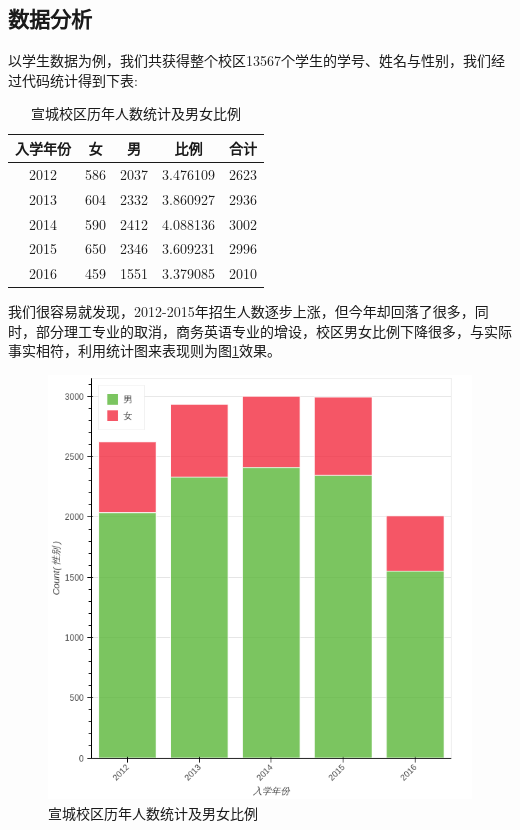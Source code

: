 \documentclass[UTF8, zihao=-4, heading=false]{ctexart}
\begin{document}
     
    
    \subsection{数据分析}
    
    以学生数据为例，我们共获得整个校区13567个学生的学号、姓名与性别，我们经过代码统计得到下表:
    
    \begin{table}[htbp]
        \centering
        \caption{宣城校区历年人数统计及男女比例}
        \begin{tabular}{ccccc}
            \toprule
            入学年份 &女&	男&	比例&	合计\\
            \midrule
            2012&	586&	2037&	3.476109&	2623\\
            2013&	604&	2332&	3.860927&	2936\\
            2014&	590&	2412&	4.088136&	3002\\
            2015&	650&	2346&	3.609231&	2996\\
            2016&	459&	1551&	3.379085&	2010\\
        \end{tabular}
    \end{table}
    
    我们很容易就发现，2012-2015年招生人数逐步上涨，但今年却回落了很多，同时，部分理工专业的取消，商务英语专业的增设，校区男女比例下降很多，与实际事实相符，利用统计图来表现则为图\ref{fig:sex_plot}效果。
    
    \begin{figure}
        \centering
        \includegraphics[width=0.7\linewidth]{figure/sex_plot}
        \caption{宣城校区历年人数统计及男女比例}
        \label{fig:sex_plot}
    \end{figure}
    
\end{document}
